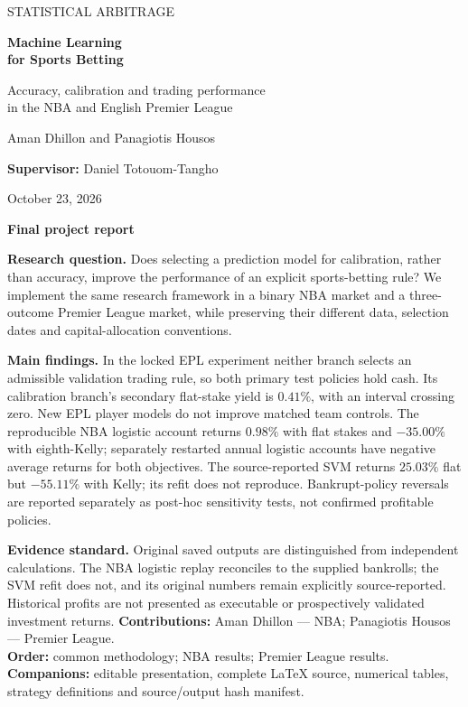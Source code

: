 \documentclass[11pt,letterpaper]{article}
\begin{document}
\begin{titlepage}
\thispagestyle{empty}
{\sffamily\color{teal}\large STATISTICAL ARBITRAGE\par}
\vspace{24pt}
{\sffamily\color{navy}\fontsize{31}{35}\selectfont\bfseries Machine Learning\\for Sports Betting\par}
\vspace{10pt}
{\sffamily\color{navy}\Large Accuracy, calibration and trading performance\\in the NBA and English Premier League\par}
\vspace{24pt}
{\Large Aman Dhillon \quad and \quad Panagiotis Housos\par}
\vspace{10pt}
{\large\textbf{Supervisor:} Daniel Totouom-Tangho\par}
\vspace{8pt}
{\large October 23, 2026\par}
\vspace{18pt}
{\sffamily\large\bfseries Final project report\par}
\vspace{8pt}
\textbf{Research question.} Does selecting a prediction model for calibration,
rather than accuracy, improve the performance of an explicit sports-betting rule?
We implement the same research framework in a binary NBA market and a
three-outcome Premier League market, while preserving their different data,
selection dates and capital-allocation conventions.

\textbf{Main findings.} In the locked EPL experiment neither branch selects
an admissible validation trading rule, so both primary test policies hold
cash. Its calibration branch's secondary flat-stake yield is $0.41\%$, with
an interval crossing zero. New EPL player models do not improve matched
team controls. The reproducible NBA logistic account returns $0.98\%$ with
flat stakes and $-35.00\%$ with eighth-Kelly; separately restarted annual
logistic accounts have negative average returns for both objectives. The
source-reported SVM returns $25.03\%$ flat but $-55.11\%$ with Kelly; its
refit does not reproduce. Bankrupt-policy reversals are reported separately
as post-hoc sensitivity tests, not confirmed profitable policies.

\textbf{Evidence standard.} Original saved outputs are distinguished from
independent calculations. The NBA logistic replay reconciles to the supplied
bankrolls; the SVM refit does not, and its original numbers remain explicitly
source-reported. Historical profits are not presented as executable or
prospectively validated investment returns.
\vfill
\textbf{Contributions:} Aman Dhillon --- NBA; Panagiotis Housos --- Premier League.\\
\textbf{Order:} common methodology; NBA results; Premier League results.\\
\textbf{Companions:} editable presentation, complete LaTeX source, numerical
tables, strategy definitions and source/output hash manifest.
\end{titlepage}
\end{document}
